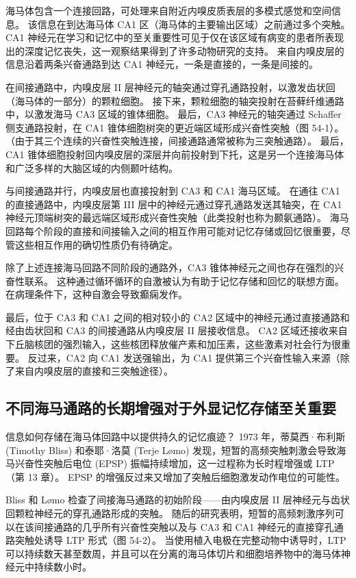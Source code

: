 海马体包含一个连接回路，可处理来自附近内嗅皮质表层的多模式感觉和空间信息。 该信息在到达海马体 CA1 区（海马体的主要输出区域）之前通过多个突触。 CA1 神经元在学习和记忆中的至关重要性可见于仅在该区域有病变的患者所表现出的深度记忆丧失，这一观察结果得到了许多动物研究的支持。 来自内嗅皮层的信息沿着两条兴奋通路到达 CA1 神经元，一条是直接的，一条是间接的。

在间接通路中，内嗅皮层 II 层神经元的轴突通过穿孔通路投射，以激发齿状回（海马体的一部分）的颗粒细胞。 接下来，颗粒细胞的轴突投射在苔藓纤维通路中，以激发海马 CA3 区域的锥体细胞。 最后，CA3 神经元的轴突通过 Schaffer 侧支通路投射，在 CA1 锥体细胞树突的更近端区域形成兴奋性突触（图 54-1）。 （由于其三个连续的兴奋性突触连接，间接通路通常被称为三突触通路）。 最后，CA1 锥体细胞投射回内嗅皮层的深层并向前投射到下托，这是另一个连接海马体和广泛多样的大脑区域的内侧颞叶结构。

与间接通路并行，内嗅皮层也直接投射到 CA3 和 CA1 海马区域。 在通往 CA1 的直接通路中，内嗅皮层第 III 层中的神经元通过穿孔通路发送其轴突，在 CA1 神经元顶端树突的最远端区域形成兴奋性突触（此类投射也称为颞氨通路）。 海马回路每个阶段的直接和间接输入之间的相互作用可能对记忆存储或回忆很重要，尽管这些相互作用的确切性质仍有待确定。

除了上述连接海马回路不同阶段的通路外，CA3 锥体神经元之间也存在强烈的兴奋性联系。 这种通过循环循环的自激被认为有助于记忆存储和回忆的联想方面。 在病理条件下，这种自激会导致癫痫发作。

最后，位于 CA3 和 CA1 之间的相对较小的 CA2 区域中的神经元通过直接通路和经由齿状回和 CA3 的间接通路从内嗅皮层 II 层接收信息。 CA2 区域还接收来自下丘脑核团的强烈输入，这些核团释放催产素和加压素，这些激素对社会行为很重要。 反过来，CA2 向 CA1 发送强输出，为 CA1 提供第三个兴奋性输入来源（除了来自内嗅皮层的直接和三突触途径）。

\subsection{不同海马通路的长期增强对于外显记忆存储至关重要}
信息如何存储在海马体回路中以提供持久的记忆痕迹？ 1973 年，蒂莫西·布利斯 (Timothy Bliss) 和泰耶·洛莫 (Terje Lømo) 发现，短暂的高频突触刺激会导致海马兴奋性突触后电位 (EPSP) 振幅持续增加，这一过程称为长时程增强或 LTP（第 13 章）。 EPSP 的增强反过来又增加了突触后细胞激发动作电位的可能性。

Bliss 和 Lømo 检查了间接海马通路的初始阶段——由内嗅皮层 II 层神经元与齿状回颗粒神经元的穿孔通路形成的突触。 随后的研究表明，短暂的高频刺激序列可以在该间接通路的几乎所有兴奋性突触以及与 CA3 和 CA1 神经元的直接穿孔通路突触处诱导 LTP 形式（图 54-2）。 当使用植入电极在完整动物中诱导时，LTP 可以持续数天甚至数周，并且可以在分离的海马体切片和细胞培养物中的海马体神经元中持续数小时。

